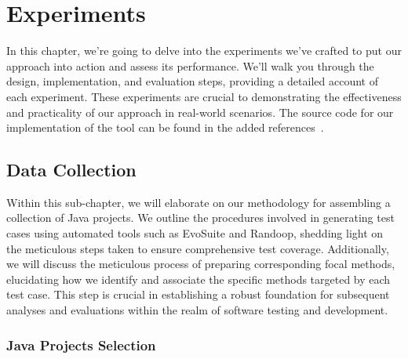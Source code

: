 \chapter{Experiments}
\label{cha:experiments}
\vspace{0.4 cm}

In this chapter, we're going to delve into the experiments we've crafted to put our approach into action and assess its performance. We'll walk you through the design, implementation, and evaluation steps, providing a detailed account of each experiment. These experiments are crucial to demonstrating the effectiveness and practicality of our approach in real-world scenarios. The source code for our implementation of the tool can be found in the added references~\cite{evooracle_github}\cite{evooracle_gitlab}.

\section{Data Collection}
\label{sec:data_collection}
\vspace{0.2 cm}
Within this sub-chapter, we will elaborate on our methodology for assembling a collection of Java projects. We outline the procedures involved in generating test cases using automated tools such as EvoSuite and Randoop\cite{noauthor_randoop_nodate}, shedding light on the meticulous steps taken to ensure comprehensive test coverage. Additionally, we will discuss the meticulous process of preparing corresponding focal methods, elucidating how we identify and associate the specific methods targeted by each test case. This step is crucial in establishing a robust foundation for subsequent analyses and evaluations within the realm of software testing and development.

\vspace{0.1 cm}
\subsection{Java Projects Selection}
\label{sec:projects_selection}
\vspace{0.1 cm}

